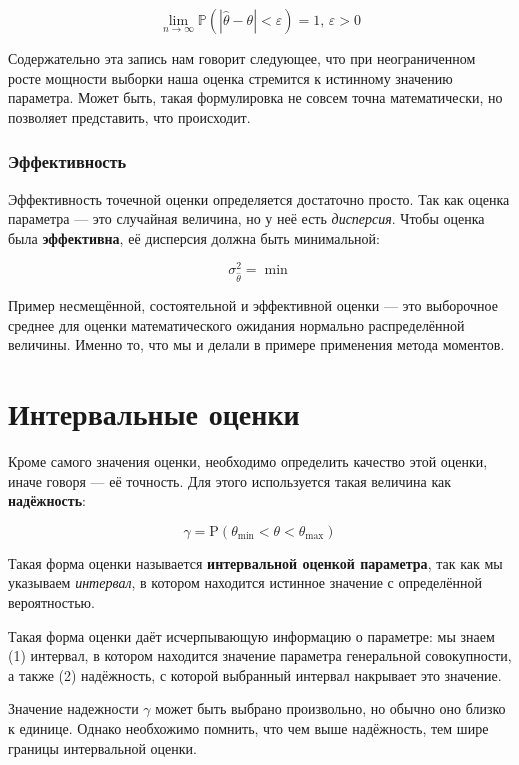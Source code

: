\documentclass[
  letterpaper,
]{scrbook}
\newcommand{\prob}{\mathbb{P}}
\theoremstyle{definition}
\theoremstyle{remark}
\begin{document}
\[
\lim_{n \rightarrow \infty} \prob (|\hat \theta - \theta| < \varepsilon) = 1, \, \varepsilon > 0
\]

Содержательно эта запись нам говорит следующее, что при неограниченном
росте мощности выборки наша оценка стремится к истинному значению
параметра. Может быть, такая формулировка не совсем точна математически,
но позволяет представить, что происходит.

\subsubsection{Эффективность}\label{ux44dux444ux444ux435ux43aux442ux438ux432ux43dux43eux441ux442ux44c}

Эффективность точечной оценки определяется достаточно просто. Так как
оценка параметра --- это случайная величина, но у неё есть
\emph{дисперсия}. Чтобы оценка была \textbf{эффективна}, её дисперсия
должна быть минимальной:

\[
\sigma^2_{\hat \theta} = \min
\]

Пример несмещённой, состоятельной и эффективной оценки --- это
выборочное среднее для оценки математического ожидания нормально
распределённой величины. Именно то, что мы и делали в примере применения
метода моментов.

\section{Интервальные
оценки}\label{ux438ux43dux442ux435ux440ux432ux430ux43bux44cux43dux44bux435-ux43eux446ux435ux43dux43aux438}

Кроме самого значения оценки, необходимо определить качество этой
оценки, иначе говоря --- её точность. Для этого используется такая
величина как \textbf{надёжность}:

\[
\gamma = \mathrm{P}(\theta_\min < \theta < \theta_\max)
\]

Такая форма оценки называется \textbf{интервальной оценкой параметра},
так как мы указываем \emph{интервал}, в котором находится истинное
значение с определённой вероятностью.

Такая форма оценки даёт исчерпывающую информацию о параметре: мы знаем
(1) интервал, в котором находится значение параметра генеральной
совокупности, а также (2) надёжность, с которой выбранный интервал
накрывает это значение.

Значение надежности \(\gamma\) может быть выбрано произвольно, но обычно
оно близко к единице. Однако необхожимо помнить, что чем выше
надёжность, тем шире границы интервальной оценки.
\end{document}
